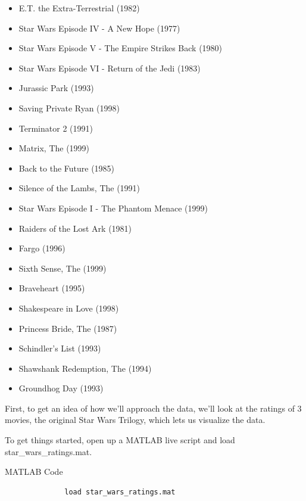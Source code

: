 \documentclass{ximera}
\begin{document}
  \begin{itemize}

    \item E.T. the Extra-Terrestrial (1982) 
    \item Star Wars Episode IV - A New Hope (1977) 
    \item Star Wars Episode V - The Empire Strikes Back (1980) 
    \item Star Wars Episode VI - Return of the Jedi (1983) 
    \item Jurassic Park (1993) 
    \item Saving Private Ryan (1998) 
    \item Terminator 2 (1991)
    \item Matrix, The (1999) 
    \item Back to the Future (1985) 
    \item Silence of the Lambs, The (1991) 
    \item Star Wars Episode I - The Phantom Menace (1999) 
    \item Raiders of the Lost Ark (1981) 
    \item Fargo (1996) 
    \item Sixth Sense, The (1999) 
    \item Braveheart (1995) 
    \item Shakespeare in Love (1998) 
    \item Princess Bride, The (1987) 
    \item Schindler's List (1993) 
    \item Shawshank Redemption, The (1994) 
    \item Groundhog Day (1993) 

  \end{itemize}

  First, to get an idea of how we'll approach the data, we'll look at the ratings of 3 movies, the original Star Wars Trilogy, which lets us visualize the data.

  To get things started, open up a MATLAB live script and load star\_wars\_ratings.mat.

  \begin{hint}{MATLAB Code}
          \begin{verbatim}
              load star_wars_ratings.mat
          \end{verbatim}
  \end{hint}
\end{document}
